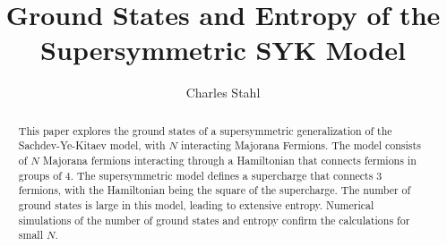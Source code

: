 \documentclass[12pt]{article} %
\begin{document}
\title{\textbf{Ground States and Entropy of the Supersymmetric SYK Model}}
\author{Charles Stahl}

\maketitle

\begin{abstract}
	This paper explores the ground states of a supersymmetric generalization of the Sachdev-Ye-Kitaev model, with $N$ interacting Majorana Fermions. The model consists of $N$ Majorana fermions interacting through a Hamiltonian that connects fermions in groups of 4. The supersymmetric model defines a supercharge that connects 3 fermions, with the Hamiltonian being the square of the supercharge. The number of ground states is large in this model, leading to extensive entropy. Numerical simulations of the number of ground states and entropy confirm the calculations for small $N$. 
\end{abstract}

\tableofcontents
\newpage
\end{document}
